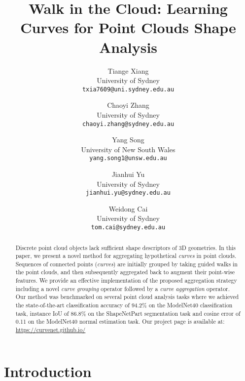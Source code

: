 \documentclass[10pt,twocolumn,letterpaper]{article}
\theoremstyle{definition}
\begin{document}
\title{\vspace{-3em}Walk in the Cloud: Learning Curves for Point Clouds Shape Analysis}

\author{Tiange Xiang\\
University of Sydney\\
{\tt\small txia7609@uni.sydney.edu.au}
\and
Chaoyi Zhang\\
University of Sydney\\
{\tt\small chaoyi.zhang@sydney.edu.au}

\and
Yang Song\\
University of New South Wales\\
{\tt\small yang.song1@unsw.edu.au}

\and
Jianhui Yu\\
University of Sydney\\
{\tt\small jianhui.yu@sydney.edu.au}

\and
Weidong Cai\\
University of Sydney\\
{\tt\small tom.cai@sydney.edu.au}
}

\maketitle
\ificcvfinal\thispagestyle{empty}\fi

\begin{abstract}
   Discrete point cloud objects lack sufficient shape descriptors of 3D geometries. In this paper, we present a novel method for aggregating hypothetical \textit{curves} in point clouds. Sequences of connected points (\textit{curves}) are initially grouped by taking guided walks in the point clouds, and then subsequently aggregated back to augment their point-wise features. We provide an effective implementation of the proposed aggregation strategy including a novel \textit{curve grouping} operator followed by a \textit{curve aggregation} operator. Our method was benchmarked on several point cloud analysis tasks where we achieved the state-of-the-art classification accuracy of 94.2\% on the ModelNet40 classification task, instance IoU of 86.8\% on the ShapeNetPart segmentation task and cosine error of 0.11 on the ModelNet40 normal estimation task. Our project page is available at: \url{https://curvenet.github.io/}
   
\end{abstract}

\section{Introduction}
\end{document}
